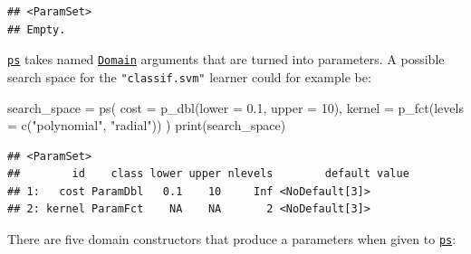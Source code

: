 \documentclass[
]{scrbook}
\newenvironment{Shaded}{\begin{snugshade}}{\end{snugshade}}
\newcommand{\AttributeTok}[1]{\textcolor[rgb]{0.77,0.63,0.00}{#1}}
\newcommand{\DecValTok}[1]{\textcolor[rgb]{0.00,0.00,0.81}{#1}}
\newcommand{\FloatTok}[1]{\textcolor[rgb]{0.00,0.00,0.81}{#1}}
\newcommand{\FunctionTok}[1]{\textcolor[rgb]{0.00,0.00,0.00}{#1}}
\newcommand{\NormalTok}[1]{#1}
\newcommand{\OtherTok}[1]{\textcolor[rgb]{0.56,0.35,0.01}{#1}}
\newcommand{\StringTok}[1]{\textcolor[rgb]{0.31,0.60,0.02}{#1}}
\renewenvironment{Shaded} {\begin{snugshade}\small} {\end{snugshade}}
\begin{document}
\begin{verbatim}
## <ParamSet>
## Empty.
\end{verbatim}

\href{https://paradox.mlr-org.com/reference/ps.html}{\texttt{ps}} takes named \href{https://paradox.mlr-org.com/reference/Domain.html}{\texttt{Domain}} arguments that are turned into parameters. A possible search space for the \texttt{"classif.svm"} learner could for example be:

\begin{Shaded}
\begin{Highlighting}[]
\NormalTok{search\_space }\OtherTok{=} \FunctionTok{ps}\NormalTok{(}
  \AttributeTok{cost =} \FunctionTok{p\_dbl}\NormalTok{(}\AttributeTok{lower =} \FloatTok{0.1}\NormalTok{, }\AttributeTok{upper =} \DecValTok{10}\NormalTok{),}
  \AttributeTok{kernel =} \FunctionTok{p\_fct}\NormalTok{(}\AttributeTok{levels =} \FunctionTok{c}\NormalTok{(}\StringTok{"polynomial"}\NormalTok{, }\StringTok{"radial"}\NormalTok{))}
\NormalTok{)}
\FunctionTok{print}\NormalTok{(search\_space)}
\end{Highlighting}
\end{Shaded}

\begin{verbatim}
## <ParamSet>
##        id    class lower upper nlevels        default value
## 1:   cost ParamDbl   0.1    10     Inf <NoDefault[3]>      
## 2: kernel ParamFct    NA    NA       2 <NoDefault[3]>
\end{verbatim}

There are five domain constructors that produce a parameters when given to \href{https://paradox.mlr-org.com/reference/ps.html}{\texttt{ps}}:
\end{document}
